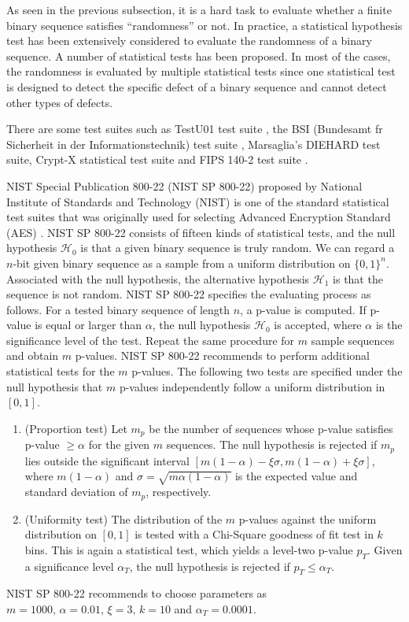 As seen in the previous subsection, it is a hard task to evaluate whether a finite binary sequence satisfies ``randomness'' or not. In practice, a statistical hypothesis test has been extensively considered to evaluate the randomness of a binary sequence. A number of statistical tests has been proposed. In most of the cases, the randomness is evaluated by multiple statistical tests since one statistical test is designed to detect the specific defect of a binary sequence and cannot detect other types of defects.
%
\par
There are some test suites such as TestU01 test suite \cite{l2007testu01}, the BSI (Bundesamt fr Sicherheit in der Informationstechnik) test suite \cite{schindler1999functionality,killmann2001proposal}, Marsaglia's DIEHARD test suite, Crypt-X statistical test suite \cite{caelli1992crypt} and FIPS 140-2 test suite \cite{fips2001140}.
\par
%
NIST Special Publication 800-22 (NIST SP 800-22) \cite{rukhin2001statistical,bassham2010sp} proposed by National Institute of Standards and Technology (NIST) is one of the standard statistical test suites that was originally used for selecting Advanced Encryption Standard (AES) \cite{rijmen2001advanced}. 
%
NIST SP 800-22 consists of fifteen kinds of statistical tests, and the null hypothesis $\mathcal{H}_0$ is that a given binary sequence is truly random. We can regard a $n$-bit given binary sequence as a sample from a uniform distribution on $\{0,1\}^n$.
Associated with the null hypothesis, the alternative hypothesis $\mathcal{H}_1$ is that the sequence is not random.
NIST SP 800-22 specifies the evaluating process as follows.
For a tested binary sequence of length $n$, a p-value is computed. If p-value is equal or larger than $\alpha$, the null hypothesis $\mathcal{H}_0$ is accepted, where $\alpha$ is the significance level of the test. Repeat the same procedure for $m$ sample sequences and obtain $m$ p-values. 
%
NIST SP 800-22 recommends to perform additional statistical tests for the $m$ p-values.
The following two tests are specified under the null hypothesis that $m$ p-values independently follow a uniform distribution in $[0,1]$.
\begin{enumerate}
  \item (Proportion test) Let $m_p$ be the number of sequences whose p-value satisfies p-value $\geq \alpha$ for the given $m$ sequences. The null hypothesis is rejected if $m_p$ lies outside the significant interval $[m(1-\alpha)-\xi\sigma, m(1-\alpha)+\xi\sigma]$, where $m(1-\alpha)$ and $\sigma = \sqrt{m\alpha(1-\alpha)}$ is the expected value and  standard deviation of $m_p$, respectively.
  \item (Uniformity test) The distribution of the $m$ p-values against the uniform distribution on $[0,1]$ is tested with a Chi-Square goodness of fit test in $k$ bins. This is again a statistical test, which yields a level-two p-value $p_T$. Given a significance level $\alpha_T$, the null hypothesis is rejected if $p_T \leq \alpha_T$.
\end{enumerate}
%
NIST SP 800-22 recommends to choose parameters as $m=1000,\,\alpha=0.01,\,\xi=3, \,k=10$ and $\alpha_T=0.0001$.
